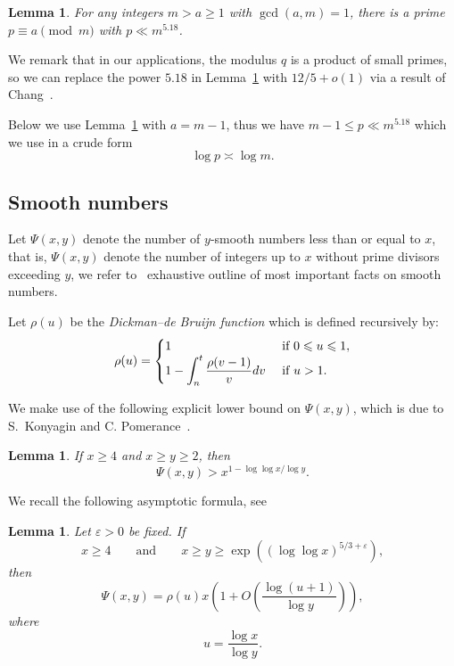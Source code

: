 \documentclass[12pt]{amsart}
\newtheorem{lemma}[theorem]{Lemma}
\numberwithin{equation}{section}
\numberwithin{theorem}{section}
\numberwithin{table}{section}
\numberwithin{figure}{section}
\def\le{\leqslant}
\def\leq{\leqslant}
\def\ge{\geqslant}
\def\leq{\leqslant}
\def\mand{\qquad\mbox{and}\qquad}
\def\\{\cr}
\def\({\left(}
\def\){\right)}
\begin{document}
\begin{lemma}
\label{lem:Linnik} For any integers $m > a \ge 1$ with $\gcd(a,m)=1$, there is a prime 
$p \equiv a \pmod m$ with $p \ll m^{5.18}$. 
\end{lemma} 

We remark that in our applications, the modulus $q$ is a product of small primes, so
we can replace the power $5.18$ in Lemma~\ref{lem:Linnik} with  $12/5+o(1)$ via a result of Chang~\cite{Chang}. 

Below we  use Lemma~\ref{lem:Linnik} with $a =m-1$, thus we have $m-1 \le p  \ll m^{5.18}$
which we use in a crude form 
$$
\log p \asymp \log m.
$$


\subsection{Smooth numbers}
Let $\Psi(x, y)$ denote the number of $y$-smooth numbers less than or equal to $x$, that is, 
$\Psi(x, y)$ denote the number of  integers up to  $x$ without prime divisors exceeding $y$, we refer to~\cite{Gran,HilTen} 
exhaustive outline of most important facts on smooth numbers. 


Let $\rho(u)$  be the {\it Dickman--de Bruijn function} which  is defined recursively by:
$$\rho(u)= 
\begin{cases} 
1 & \text{ if } 0 \leq u \leq 1,\\
{\displaystyle 1 - \int_{n}^{t}\frac{\rho(v-1)}{v}dv} & \text{ if } u>1.
\end{cases}
$$



We make use of the following explicit lower bound on $\Psi(x, y)$,  which is
due to S.~Konyagin and C. Pomerance~\cite[Theorem~2.1]{KoPo}.

\begin{lemma}
\label{lem:KPsmooth} If $x\ge 4$ and $x \ge y \ge 2$, then
$$
\Psi(x,y) > x^{1-\log \log x/\log y}.
$$
\end{lemma}

We recall the following asymptotic formula, see~\cite[Part~III, Corollary~5.19]{Ten}

\begin{lemma}
\label{lem:Smooth} Let $\varepsilon > 0$ be fixed.  If 
$$
x\ge 4 \mand x \ge y \ge \exp\(\(\log \log x\)^{5/3+\varepsilon}\),
$$ 
then
$$
\Psi(x,y) = \rho(u) x\(1+ O\(\frac{\log(u+1)}{\log y}\)\), 
$$
where 
$$
u= \frac{\log x}{\log y}.
$$ 
\end{lemma}
\end{document}
